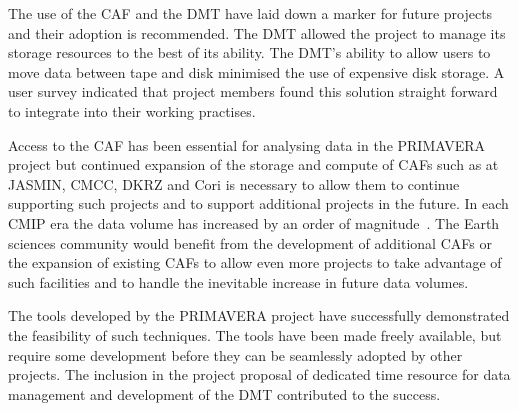 \documentclass[gmd, manuscript]{copernicus}
\begin{document}
The use of the CAF and the DMT have laid down a marker for future projects and their adoption is recommended. The DMT allowed the project to manage its storage resources to the best of its ability. The DMT's ability to allow users to move data between tape and disk minimised the use of expensive disk storage. A user survey indicated that project members found this solution straight forward to integrate into their working practises.

Access to the CAF has been essential for analysing data in the PRIMAVERA project but continued expansion of the storage and compute of CAFs such as at JASMIN, CMCC, DKRZ and Cori is necessary to allow them to continue supporting such projects and to support additional projects in the future. In each CMIP era the data volume has increased by an order of magnitude~\citep{gmd-11-3659-2018}. The Earth sciences community would benefit from the development of additional CAFs or the expansion of existing CAFs to allow even more projects to take advantage of such facilities and to handle the inevitable increase in future data volumes.

The tools developed by the PRIMAVERA project have successfully demonstrated the feasibility of such techniques. The tools have been made freely available, but require some development before they can be seamlessly adopted by other projects. The inclusion in the project proposal of dedicated time resource for data management and development of the DMT contributed to the success.





\end{document}
